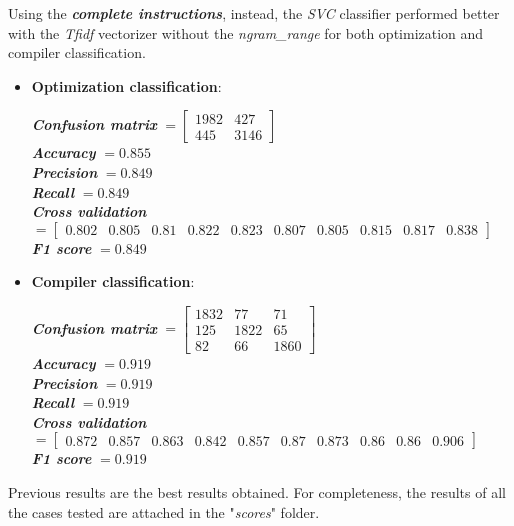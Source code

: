 \documentclass[11pt]{article}
\begin{document}
Using the \textbf{\textit{complete instructions}}, instead, the \textit{SVC} classifier performed better with the \textit{Tfidf} vectorizer without the \textit{ngram\_range} for both optimization and compiler classification.
\begin{itemize}
	\item \textbf{Optimization classification}: \\
	\begin{center}
		\textbf{\textit{Confusion matrix}} $= \begin{bmatrix}
		1982 & 427 \\
		445 & 3146
		\end{bmatrix}$\\
		\textbf{\textit{Accuracy}} $= 0.855$\\
		\textbf{\textit{Precision}} $= 0.849$\\
		\textbf{\textit{Recall}} $= 0.849$\\
		\textbf{\textit{Cross validation}} $= \begin{bmatrix}
		0.802 & 0.805 & 0.81 & 0.822 & 0.823 & 0.807 & 0.805 & 0.815 & 0.817 & 0.838
		\end{bmatrix}$\\
		\textbf{\textit{F1 score}} $= 0.849$
	\end{center}
	
	\item \textbf{Compiler classification}: \\
	\begin{center}
		\textbf{\textit{Confusion matrix}} $= \begin{bmatrix}
		1832 & 77 & 71 \\
		125 & 1822 & 65 \\
		82 & 66 & 1860
		\end{bmatrix}$\\
		\textbf{\textit{Accuracy}} $= 0.919$\\
		\textbf{\textit{Precision}} $= 0.919$\\
		\textbf{\textit{Recall}} $= 0.919$\\
		\textbf{\textit{Cross validation}} $= \begin{bmatrix}
		0.872 & 0.857 & 0.863 & 0.842 & 0.857 & 0.87 & 0.873 & 0.86 & 0.86 & 0.906
		\end{bmatrix}$\\
		\textbf{\textit{F1 score}} $= 0.919$
	\end{center}
\end{itemize}
Previous results are the best results obtained. For completeness, the results of all the cases tested are attached in the "\textit{scores}" folder.
\end{document}

